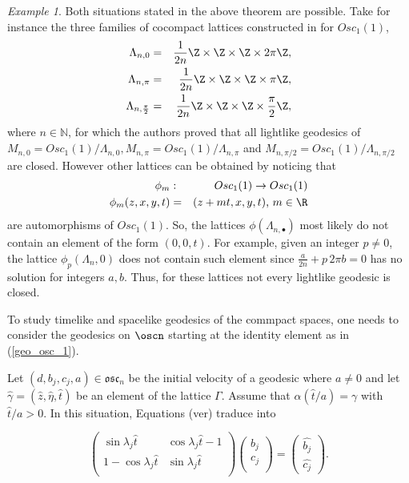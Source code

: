 \documentclass[11pt]{amsart}
\theoremstyle{plain}
\theoremstyle{definition}
\theoremstyle{remark}
\newtheorem{exa}[thm]{Example}
\begin{document}
		
		
		\begin{exa}\label{Lattice4} Both situations stated in the above theorem are possible. Take for instance the three families of cocompact lattices constructed in \cite{BOV} for  $Osc_1(1)$,
			\begin{eqnarray*} \label{geodlight}
				\Lambda_{n,0}&=&\frac{1}{2n}\Z \times \Z \times \Z \times 2 \pi \Z,\\
				\Lambda_{n,\pi}&=&\frac{1}{2n}\Z \times \Z \times \Z \times \pi \Z,\\
				\Lambda_{n,\frac{\pi}{2}}&=&\frac{1}{2n}\Z \times \Z \times \Z \times \frac{\pi}{2} \Z,
			\end{eqnarray*}
			where $n \in \mathbb{N}$, for which the authors proved that all lightlike geodesics of $M_{n,0}=Osc_1(1)/\Lambda_{n,0}, M_{n,\pi}=Osc_1(1)/\Lambda_{n,\pi}$ and $M_{n,\pi/2}=Osc_1(1)/\Lambda_{n,\pi/2}$ are closed. However other  lattices can be obtained by noticing that
			\begin{eqnarray*}
				\phi_m &:& Osc_1(1) \rightarrow Osc_1(1)\\
				\phi_m(z,x,y,t)&=&(z+mt,x,y,t) \textrm{,    $m \in \R$}
			\end{eqnarray*}
			are  automorphisms of $Osc_1(1)$. So, the  lattices $\phi(\Lambda_{n,\bullet})$ most likely do not contain an element of the form $(0,0, t)$. For example, given an integer $p \neq 0$, the lattice $\phi_p(\Lambda_n,0)$ does not contain such element since $\frac{a}{2 n}+ p \, 2 \pi b = 0$ has no solution for integers $a,b$. Thus, for these lattices not every lightlike geodesic is closed. \\
			
		\end{exa}
		
		
		To  study  timelike and spacelike geodesics of the commpact spaces, one needs to  consider the geodesics on $\oscn$ starting at the identity element as in (\ref{geo_osc_1}).
		
		 Let  $(d,b_j,c_j,a)\in \mathfrak{osc}_n$ be the initial velocity of a geodesic where $a\neq0$ and let $\hat{\gamma}=(\hat{z}, \hat{\eta}, \hat{t})$ be an element of the lattice $\Gamma$. Assume that $\alpha(\hat{t}/a)=\gamma$ with $\hat{t}/a > 0$. In this situation, Equations (ver) traduce into
		
		\begin{equation}\label{oscilador_geos_1}
			\left( \begin{matrix}
				\sin{\lambda_j \hat{t}} & \cos{\lambda_j \hat{t}} -1 \\
				1 - \cos{\lambda_j \hat{t}} & \sin{\lambda_j \hat{t}} \\
			\end{matrix} \right)
			\left( \begin{matrix}
				b_j \\
				c_j \\
			\end{matrix} \right)=
			\left( \begin{matrix}
				\hat{b_j} \\
				\hat{c_j}
			\end{matrix} \right).
		\end{equation}
		
\end{document}
